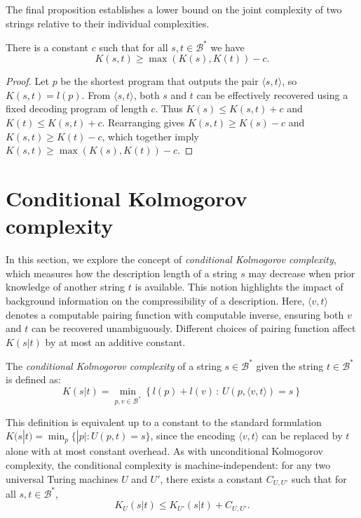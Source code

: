 The final proposition establishes a lower bound on the joint complexity of two strings relative to their individual complexities.

\begin{proposition}
\label{prop:excess_kolmogorov}
There is a constant $c$ such that for all $s, t \in \mathcal{B}^{\ast}$ we have
\[
K(s, t) \geq \max(K(s), K(t)) - c.
\]
\end{proposition}
\begin{proof}
Let $p$ be the shortest program that outputs the pair $\langle s,t\rangle$, so $K(s,t) = l(p)$. From $\langle s,t\rangle$, both $s$ and $t$ can be effectively recovered using a fixed decoding program of length $c$. Thus $K(s) \le K(s,t) + c$ and $K(t) \le K(s,t) + c$. Rearranging gives $K(s,t) \ge K(s) - c$ and $K(s,t) \ge K(t) - c$, which together imply $K(s,t) \ge \max(K(s),K(t)) - c$.
\end{proof}

%
%

\section{Conditional Kolmogorov complexity}

In this section, we explore the concept of \emph{conditional Kolmogorov complexity}, which measures how the description length of a string $s$ may decrease when prior knowledge of another string $t$ is available. This notion highlights the impact of background information on the compressibility of a description. Here, $\langle v,t\rangle$ denotes a computable pairing function with computable inverse, ensuring both $v$ and $t$ can be recovered unambiguously. Different choices of pairing function affect $K(s|t)$ by at most an additive constant.

\begin{definition}
The \emph{conditional Kolmogorov complexity} of a string $s \in \mathcal{B}^{\ast}$ given the string $t \in \mathcal{B}^{\ast}$ is defined as:
\[
K(s|t)=\min_{p, v \in \mathcal{B}^{\ast}}\left\{l(p) + l(v)\,:\, U(p,\langle v, t \rangle)=s\right\}
\]
\end{definition}

This definition is equivalent up to a constant to the standard formulation $K(s|t) = \min_p \{|p| : U(p,t) = s\}$, since the encoding $\langle v,t\rangle$ can be replaced by $t$ alone with at most constant overhead. As with unconditional Kolmogorov complexity, the conditional complexity is machine-independent: for any two universal Turing machines $U$ and $U'$, there exists a constant $C_{U,U'}$ such that for all $s, t \in \mathcal{B}^{\ast}$,
\[
K_{U}(s|t) \leq K_{U'}(s|t) + C_{U,U'}.
\]

